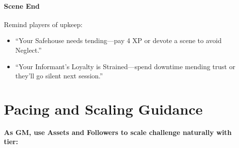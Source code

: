 \paragraph{Scene End}
Remind players of upkeep:  
\begin{itemize}
  \item ``Your Safehouse needs tending---pay 4 XP or devote a scene to avoid Neglect.''  
  \item ``Your Informant's Loyalty is Strained---spend downtime mending trust or they'll go silent next session.''  
\end{itemize}

\section{Pacing and Scaling Guidance}
\label{sec:pacing-scaling}
\textbf{As GM, use Assets and Followers to scale challenge naturally with tier:}  

